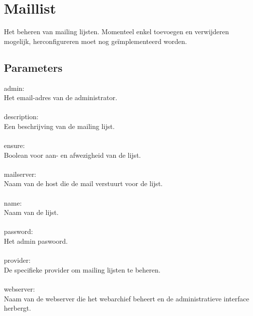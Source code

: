 \section{Maillist}

Het beheren van mailing lijsten. Momenteel enkel toevoegen en verwijderen mogelijk, herconfigureren moet nog ge\"implementeerd worden.

\subsection{Parameters}
admin:\\
Het email-adres van de administrator.\\\\
%
description:\\
Een beschrijving van de mailing lijst.\\\\
%
ensure:\\
Boolean voor aan- en afwezigheid van de lijst.\\\\
%
mailserver:\\
Naam van de host die de mail verstuurt voor de lijst.\\\\
%
name:\\
Naam van de lijst.\\\\
%
password:\\
Het admin paswoord.\\\\
%
provider:\\
De specifieke provider om mailing lijsten te beheren.\\\\
%
webserver:\\
Naam van de webserver die het webarchief beheert en de administratieve interface herbergt.\\\\
